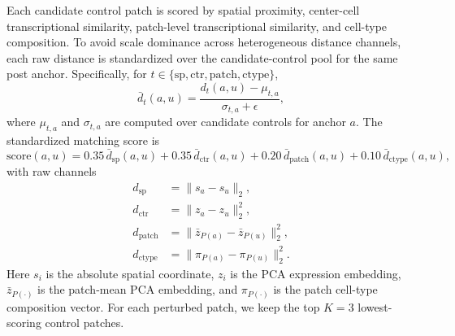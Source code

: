 \documentclass[sigconf,anonymous,review]{acmart}
\begin{document}
Each candidate control patch is scored by spatial proximity, center-cell transcriptional similarity, patch-level transcriptional similarity, and cell-type composition. To avoid scale dominance across heterogeneous distance channels, each raw distance is standardized over the candidate-control pool for the same post anchor. Specifically, for $t\in\{\mathrm{sp},\mathrm{ctr},\mathrm{patch},\mathrm{ctype}\}$,
\[
\bar d_t(a,u)=\frac{d_t(a,u)-\mu_{t,a}}{\sigma_{t,a}+\epsilon},
\]
where $\mu_{t,a}$ and $\sigma_{t,a}$ are computed over candidate controls for anchor $a$. The standardized matching score is
\[
\mathrm{score}(a,u)
=
0.35\,\bar d_{\mathrm{sp}}(a,u)
+
0.35\,\bar d_{\mathrm{ctr}}(a,u)
+
0.20\,\bar d_{\mathrm{patch}}(a,u)
+
0.10\,\bar d_{\mathrm{ctype}}(a,u),
\]
with raw channels
\[
\begin{aligned}
d_{\mathrm{sp}}
&=\|s_a-s_u\|_2,\\
d_{\mathrm{ctr}}
&=\|z_a-z_u\|_2^2,\\
d_{\mathrm{patch}}
&=\|\bar z_{P(a)}-\bar z_{P(u)}\|_2^2,\\
d_{\mathrm{ctype}}
&=\|\pi_{P(a)}-\pi_{P(u)}\|_2^2 .
\end{aligned}
\]
Here $s_i$ is the absolute spatial coordinate, $z_i$ is the PCA expression embedding, $\bar z_{P(\cdot)}$ is the patch-mean PCA embedding, and $\pi_{P(\cdot)}$ is the patch cell-type composition vector. For each perturbed patch, we keep the top $K=3$ lowest-scoring control patches.
\end{document}
